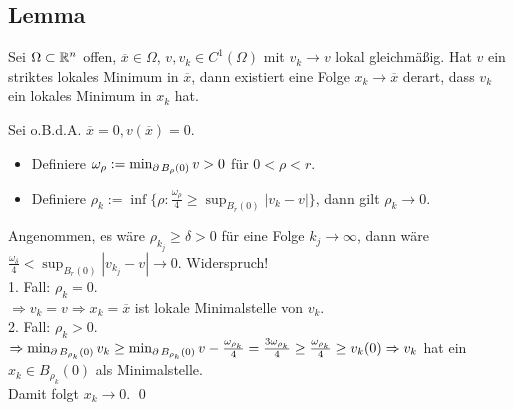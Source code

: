 \subsection{Lemma}
\label{lemma_21}
	Sei $\Omega \subset \mathbb{R}^n$ offen, \marginnote{[21]} $\overline{x} \in \Omega$, $v, v_k \in C^1(\Omega)$ mit $v_k \rightarrow v$ lokal gleichmäßig. Hat $v$ ein striktes lokales Minimum in $\overline{x}$, dann existiert eine Folge $x_k \rightarrow \overline{x}$ derart, dass $v_k$ ein lokales Minimum in $x_k$ hat.
	
	Sei o.B.d.A. $\overline{x} = 0, v(\overline{x})=0$. \begin{itemize}
		\item Definiere $\omega_\rho := \min_{\operatorname{\partial} B_\rho(0)} v > 0$ für $0 < \rho < r$.
		\item Definiere $\rho_k := \inf\{ \rho : \frac{\omega_\rho}{4} \geq \sup_{B_r(0)} |v_k-v|\}$, dann gilt $\rho_k \rightarrow 0$.
	\end{itemize}
	Angenommen, es wäre $\rho_{k_j} \geq \delta > 0$ für eine Folge $k_j \rightarrow \infty$, dann wäre $\frac{\omega_\delta}{4} < \sup_{B_r(0)} |v_{k_j} - v| \rightarrow 0$. Widerspruch! \\
	1. Fall: $\rho_k = 0$. \\
	$\Rightarrow v_k = v \Rightarrow x_k = \overline{x}$ ist lokale Minimalstelle von $v_k$. \\
	2. Fall: $\rho_k > 0$. \\
	$\Rightarrow \min_{\operatorname{\partial} B_{\rho_k}(0)} v_k \geq \min_{\operatorname{\partial} B_{\rho_k}(0)} v - \frac{\omega_{\rho_k}}{4} = \frac{3 \omega_{\rho_k}}{4} \geq \frac{\omega_{\rho_k}}{4} \geq v_k(0) \Rightarrow v_k$ hat ein $x_k \in B_{\rho_k}(0)$ als Minimalstelle. \\
	Damit folgt $x_k \rightarrow 0$. \qed

